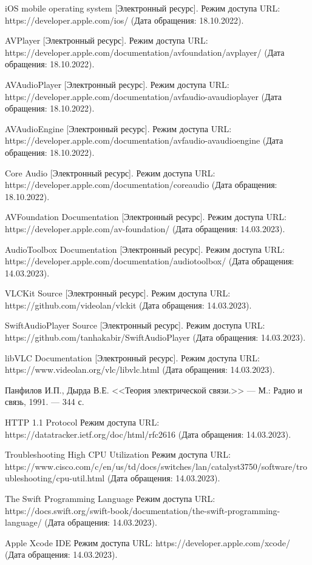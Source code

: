 \begin{thebibliography}{}
	iOS mobile operating system [Электронный ресурс].
	Режим доступа URL: https://developer.apple.com/ios/ (Дата обращения: 18.10.2022).
	
	AVPlayer [Электронный ресурс].
	Режим доступа URL: https://developer.apple.com/documentation/avfoundation/avplayer/ (Дата обращения: 18.10.2022).

	AVAudioPlayer [Электронный ресурс].
	Режим доступа URL: https://developer.apple.com/documentation/avfaudio-avaudioplayer (Дата обращения: 18.10.2022).
	
	AVAudioEngine [Электронный ресурс].
	Режим доступа URL: https://developer.apple.com/documentation/avfaudio-avaudioengine (Дата обращения: 18.10.2022).
	
	Core Audio [Электронный ресурс].
	Режим доступа URL: https://developer.apple.com/documentation/coreaudio (Дата обращения: 18.10.2022).

	AVFoundation Documentation [Электронный ресурс].
	Режим доступа URL: https://developer.apple.com/av-foundation/ (Дата обращения: 14.03.2023).

	AudioToolbox Documentation [Электронный ресурс].
	Режим доступа URL: https://developer.apple.com/documentation/audiotoolbox/ (Дата обращения: 14.03.2023).

	VLCKit Source [Электронный ресурс].
	Режим доступа URL: https://github.com/videolan/vlckit (Дата обращения: 14.03.2023).

	SwiftAudioPlayer Source [Электронный ресурс].
	Режим доступа URL: https://github.com/tanhakabir/SwiftAudioPlayer (Дата обращения: 14.03.2023).

	libVLC Documentation [Электронный ресурс].
	Режим доступа URL: https://www.videolan.org/vlc/libvlc.html (Дата обращения: 14.03.2023).

	Панфилов И.П., Дырда В.Е. <<Теория электрической связи.>> — М.: Радио и связь, 1991. — 344 с.

	HTTP 1.1 Protocol
	Режим доступа URL: https://datatracker.ietf.org/doc/html/rfc2616 (Дата обращения: 14.03.2023).

	Troubleshooting High CPU Utilization
	Режим доступа URL: https://www.cisco.com/c/en/us/td/docs/switches/lan/catalyst3750/software/troubleshooting/cpu-util.html (Дата обращения: 14.03.2023).

	The Swift Programming Language
	Режим доступа URL: https://docs.swift.org/swift-book/documentation/the-swift-programming-language/ (Дата обращения: 14.03.2023).

	Apple Xcode IDE
	Режим доступа URL: https://developer.apple.com/xcode/ (Дата обращения: 14.03.2023).

\end{thebibliography}
\endgroup

\pagebreak